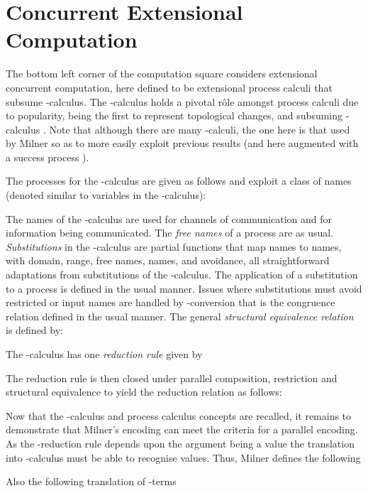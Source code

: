 \documentclass{llncs}
\begin{document}
\section{Concurrent Extensional Computation}
\label{sec:cec}

The bottom left corner of the computation square considers extensional concurrent computation,
here defined to be extensional process calculi that subsume -calculus.
The -calculus \cite{milner.parrow.ea:calculus-mobile} holds a pivotal r\^ole amongst process
calculi due to popularity, being the first to represent topological changes, and subsuming
-calculus \cite{90426}.
Note that although there are many -calculi, the one here is that used by Milner so as to 
more easily exploit previous results \cite{90426} (and here augmented with a success process ).


The processes for the -calculus are given as follows and exploit a class of names (denoted  similar to variables in the -calculus):

The names of the -calculus are used for channels of communication and for information being communicated. 
The {\em free names} of a process  are as usual. 
{\em Substitutions} in the -calculus are partial functions that map names to names,
with domain, range, free names, names, and avoidance, all straightforward adaptations from
substitutions of the -calculus.
The application of a substitution to a process is defined in the usual manner.
Issues where substitutions must avoid restricted or input names are handled by -conversion  that is the congruence relation defined in the usual manner.
The general {\em structural equivalence relation}  is defined by:


The -calculus has one {\em reduction rule} given by

The reduction rule is then closed under parallel composition, restriction and structural equivalence to yield the reduction relation  as follows:


Now that the -calculus and process calculus concepts are recalled, it remains to
demonstrate that Milner's encoding \cite{90426} can meet the criteria for a parallel encoding.
As the -reduction rule depends upon the argument being a value the translation into -calculus must be able to recognise values. Thus, Milner defines the following

Also the following translation of -terms
\end{document}
